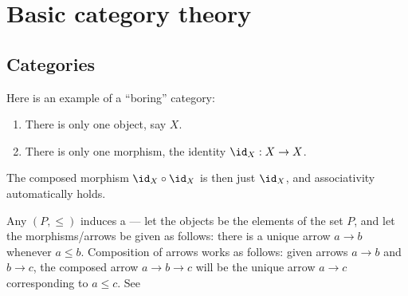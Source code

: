 \section{Basic category theory}

\subsection{Categories}




\begin{example}
    Here is an example of a ``boring'' category:
    \begin{enumerate}
        \item There is only one object, say $X$.
        \item There is only one morphism, the identity $\id_X: X \to X$.
    \end{enumerate}
    The composed morphism $\id_X \circ \id_X$ is then just $\id_X$, and associativity automatically holds.
\end{example}

\begin{example}
    Any  $(P,\leq)$ induces a  --- let the objects be the elements of the set $P$, and let the morphisms/arrows be given as follows: there is a unique arrow $a \to b$ whenever $a \leq b$. Composition of arrows works as follows: given arrows $a \to b$ and $b \to c$, the composed arrow $a \to b \to c$ will be the unique arrow $a \to c$ corresponding to $a \leq c$. See 
\end{example}



